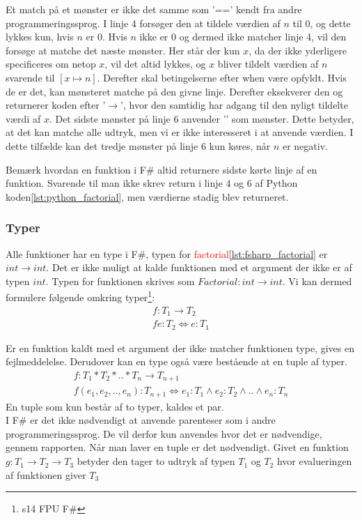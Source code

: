 Et match på et mønster er ikke det samme som '==' kendt fra andre programmeringssprog. I linje 4 forsøger den at tildele værdien af \(n\) til 0, og dette lykkes kun, hvis \(n\) er 0. Hvis \(n\) ikke er 0 og dermed ikke matcher linje 4, vil den forsøge at matche det næste mønster. Her står der kun \(x\), da der ikke yderligere specificeres om netop \(x\), vil det altid lykkes, og \(x\) bliver tildelt værdien af \(n\) svarende til \( [x \mapsto n] \). Derefter skal betingelserne efter \textcolor{codepurple}{when} være opfyldt. Hvis de er det, kan mønsteret matche på den givne linje. Derefter eksekverer den og returnerer koden efter '$\rightarrow$', hvor den samtidig har adgang til den nyligt tildelte værdi af \(x\). 
Det sidste mønster på linje 6 anvender '\textunderscore' som mønster. 
Dette betyder, at det kan matche alle udtryk, men vi er ikke interesseret i at anvende værdien. I dette tilfælde kan det tredje mønster på linje 6 kun køres, når \(n\) er negativ.

Bemærk hvordan en funktion i F\# altid returnere sidste kørte linje af en funktion. Svarende til man ikke skrev \textcolor{codepurple}{return} i linje 4 og 6 af Python koden\ref{lst:python_factorial}, men værdierne stadig blev returneret. 

\subsubsection{Typer}
Alle funktioner har en type i F\#, typen for \textcolor{red}{factorial}\ref{lst:fsharp_factorial} er $int \rightarrow int$. Det er ikke muligt at kalde funktionen med et argument der ikke er af typen $int$. Typen for funktionen skrives som $Factorial: int \rightarrow int$. Vi kan dermed formulere følgende omkring typer\footnote{s14 FPU F\#}: 
\begin{gather*}
    f: T_1 \rightarrow T_2 \\
    f e : T_2 \iff e : T_1
\end{gather*}

Er en funktion kaldt med et argument der ikke matcher funktionen type, gives en fejlmeddelelse. Derudover kan en type også være bestående at en tuple af typer.
\begin{gather*}
    f: T_1 * T_2 * .. * T_n \rightarrow T_{n+1}\\
    f (e_1, e_2, .., e_n) :T_{n+1} \iff e_1 : T_1 \land e_2 : T_2 \land .. \land e_n : T_n
\end{gather*}
En tuple som kun består af to typer, kaldes et par. \\I F\# er det ikke nødvendigt at anvende parenteser som i andre programmeringssprog. De vil derfor kun anvendes hvor det er nødvendige, gennem rapporten. Når man laver en tuple er det nødvendigt.
Givet en funktion $g: T_1 \rightarrow T_2 \rightarrow T_3$ betyder den tager to udtryk af typen $T_1$ og $T_2$ hvor evalueringen af funktionen giver $T_3$
 
